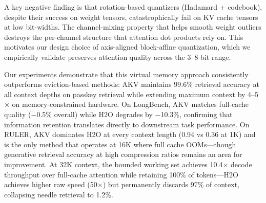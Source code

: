 \documentclass[11pt,a4paper]{article}
\begin{document}
A key negative finding is that rotation-based quantizers (Hadamard + codebook), despite their success on weight tensors, catastrophically fail on KV cache tensors at low bit-widths. The channel-mixing property that helps smooth weight outliers destroys the per-channel structure that attention dot products rely on. This motivates our design choice of axis-aligned block-affine quantization, which we empirically validate preserves attention quality across the 3--8 bit range.

Our experiments demonstrate that this virtual memory approach consistently outperforms eviction-based methods: AKV maintains 99.6\% retrieval accuracy at all context depths on passkey retrieval while extending maximum context by 4--5$\times$ on memory-constrained hardware. On LongBench, AKV matches full-cache quality ($-$0.5\% overall) while H2O degrades by $-$10.3\%, confirming that information retention translates directly to downstream task performance. On RULER, AKV dominates H2O at every context length (0.94 vs 0.36 at 1K) and is the only method that operates at 16K where full cache OOMs---though generative retrieval accuracy at high compression ratios remains an area for improvement. At 32K context, the bounded working set achieves 10.4$\times$ decode throughput over full-cache attention while retaining 100\% of tokens---H2O achieves higher raw speed (50$\times$) but permanently discards 97\% of context, collapsing needle retrieval to 1.2\%.
\end{document}
